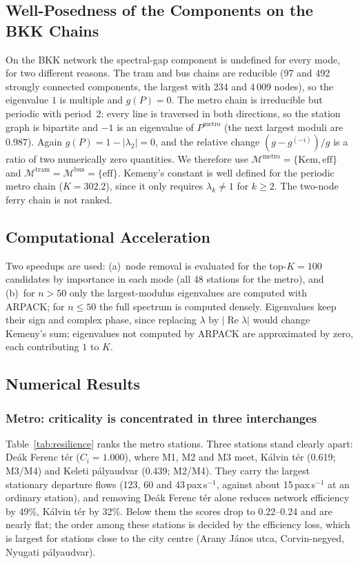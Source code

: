 \documentclass[12pt,a4paper]{article}
\theoremstyle{plain}
\theoremstyle{definition}
\theoremstyle{remark}
\begin{document}
\subsection{Well-Posedness of the Components on the BKK Chains}
\label{sec:wellposed}

On the BKK network the spectral-gap component is undefined for every mode, for
two different reasons.  The tram and bus chains are reducible (97 and 492
strongly connected components, the largest with 234 and 4\,009 nodes), so the
eigenvalue $1$ is multiple and $g(P)=0$.  The metro chain is irreducible but
periodic with period~2: every line is traversed in both directions, so the
station graph is bipartite and $-1$ is an eigenvalue of $P^{\mathrm{metro}}$
(the next largest moduli are $0.987$).  Again $g(P)=1-|\lambda_2|=0$, and the
relative change $(g-g^{(-i)})/g$ is a ratio of two numerically zero quantities.
We therefore use $\mathcal{M}^{\mathrm{metro}}=\{\mathrm{Kem},\mathrm{eff}\}$
and $\mathcal{M}^{\mathrm{tram}}=\mathcal{M}^{\mathrm{bus}}=\{\mathrm{eff}\}$.
Kemeny's constant is well defined for the periodic metro chain
($K=302.2$), since it only requires $\lambda_k\ne1$ for $k\ge2$.  The
two-node ferry chain is not ranked.

\subsection{Computational Acceleration}

Two speedups are used: (a)~node removal is evaluated for the top-$K=100$
candidates by importance in each mode (all 48 stations for the metro), and
(b)~for $n>50$ only the largest-modulus eigenvalues are computed with ARPACK;
for $n\le50$ the full spectrum is computed densely.  Eigenvalues keep their
sign and complex phase, since replacing $\lambda$ by $|\operatorname{Re}\lambda|$
would change Kemeny's sum; eigenvalues not computed by ARPACK are approximated
by zero, each contributing $1$ to $K$.

\subsection{Numerical Results}

\subsubsection{Metro: criticality is concentrated in three interchanges}
\label{sec:finding1}

Table~\ref{tab:resilience} ranks the metro stations.  Three stations stand
clearly apart: De\'ak Ferenc t\'er ($C_i=1.000$), where M1, M2 and M3 meet,
K\'alvin t\'er (0.619; M3/M4) and Keleti p\'alyaudvar (0.439; M2/M4).  They
carry the largest stationary departure flows (123, 60 and 43\,pax\,s$^{-1}$,
against about 15\,pax\,s$^{-1}$ at an ordinary station), and removing De\'ak
Ferenc t\'er alone reduces network efficiency by 49\%, K\'alvin t\'er by 32\%.
Below them the scores drop to 0.22--0.24 and are nearly flat; the order among
these stations is decided by the efficiency loss, which is largest for
stations close to the city centre (Arany J\'anos utca,
Corvin-negyed, Nyugati p\'alyaudvar).
\end{document}
